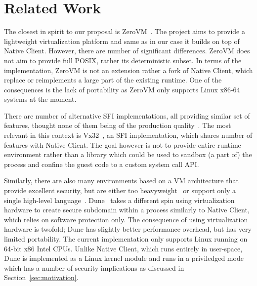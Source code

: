 \section{Related Work}
\label{sec:related}

The closest in spirit to our proposal is ZeroVM~\cite{zerovm}. The
project aims to provide a lightweight virtualization platform and same
as in our case it builds on top of Native Client.  However, there are
number of significant differences. ZeroVM does not aim to provide full
POSIX, rather its deterministic subset. In terms of the implementation,
ZeroVM is not an extension rather a fork of Native Client, which replace
or reimplements a large part of the existing runtime. One of the
consequences is the lack of portability as ZeroVM only supports Linux
x86-64 systems at the moment.

There are number of alternative SFI implementations, all providing
similar set of features, thought none of them being of the production
quality~\cite{small:coots97,mccamant:usenix-sec06}.  The most relevant
in this context is Vx32~\cite{ford:usenix-atc08}, an SFI implementation,
which shares number of features with Native Client. The goal however is
not to provide entire runtime environment rather than a library which
could be used to sandbox (a part of) the process and confine the guest
code to a custom system call API. 


Similarly, there are also many environments based on a VM architecture
that provide excellent security, but are either too
heavyweight~\cite{adl-tabatabai:pldi96,bugnion:tocs97,waldspurger:osdi02,barham:sosp03,ford:fast05}
or support only a single high-level
language~\cite{lindholm:java99,richter:clr10}. Dune~\cite{belay:osdi12}
takes a different spin using virtualization hardware to create secure
subdomain within a process similarly to Native Client, which relies on
software protection only. The consequence of using virtualization
hardware is twofold; Dune has slightly better performance overhead, but
has very limited portability.  The current implementation only supports
Linux running on 64-bit x86 Intel CPUs. Unlike Native Client, which runs
entirely in user-space, Dune is implemented as a Linux kernel module and
runs in a priviledged mode which has a number of security implications
as discussed in Section~\ref{sec:motivation}.

